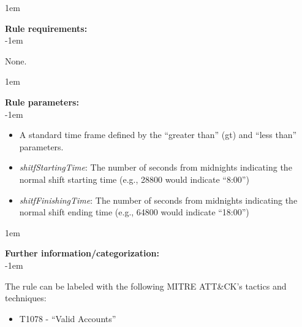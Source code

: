 \openup 1em

{\bf Rule requirements:} \\

\openup -1em
\vspace{-2em}

None.

\openup 1em

{\bf Rule parameters:} \\

\openup -1em
\vspace{-2em}

\begin{itemize}
	\item A standard time frame defined by the ``greater than'' (gt) and ``less than'' parameters.
	\item \emph{shitfStartingTime}: The number of seconds from midnights indicating the normal shift starting time (e.g., 28800 would indicate ``8:00'')
	\item \emph{shitfFinishingTime}: The number of seconds from midnights indicating the normal shift ending time (e.g., 64800 would indicate ``18:00'')
\end{itemize}

\openup 1em

{\bf Further information/categorization:} \\

\openup -1em
\vspace{-2em}


The rule can be labeled with the following MITRE ATT\&CK's tactics and techniques:
\begin{itemize}
	\item T1078 - ``Valid Accounts''
\end{itemize}

\pagebreak

